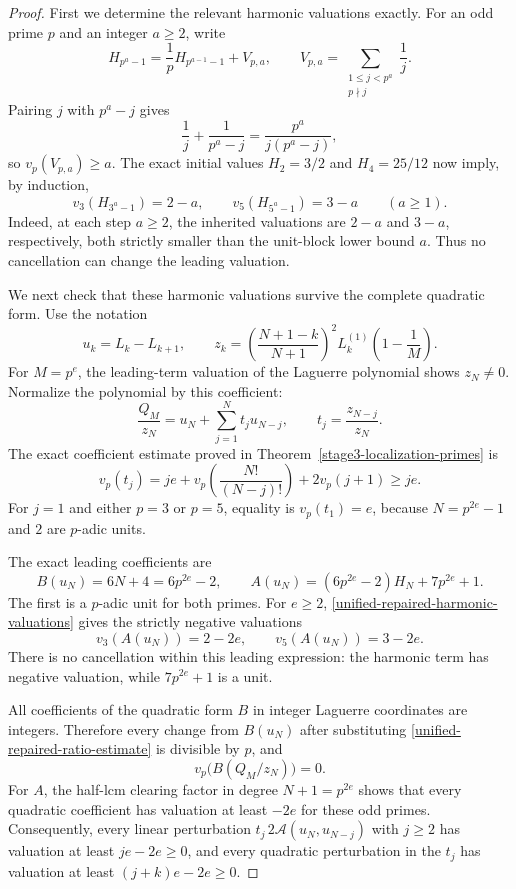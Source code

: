 \documentclass[11pt,a4paper]{article}
\theoremstyle{definition}
\theoremstyle{remark}
\begin{document}
\begin{proof}
First we determine the relevant harmonic valuations exactly.
For an odd prime $p$ and an integer $a\ge2$, write
\[
 H_{p^a-1}=\frac1pH_{p^{a-1}-1}+V_{p,a},
 \qquad
 V_{p,a}=\sum_{\substack{1\le j<p^a\\p\nmid j}}\frac1j.
\]
Pairing $j$ with $p^a-j$ gives
\[
 \frac1j+\frac1{p^a-j}
 =\frac{p^a}{j(p^a-j)},
\]
so $v_p(V_{p,a})\ge a$.  The exact initial values
$H_2=3/2$ and $H_4=25/12$ now imply, by induction,
\begin{equation}\label{unified-repaired-harmonic-valuations}
 v_3(H_{3^a-1})=2-a,
 \qquad
 v_5(H_{5^a-1})=3-a
 \qquad(a\ge1).
\end{equation}
Indeed, at each step $a\ge2$, the inherited valuations are
$2-a$ and $3-a$, respectively, both strictly smaller than the
unit-block lower bound $a$.  Thus no cancellation can change
the leading valuation.

We next check that these harmonic valuations survive the complete
quadratic form.  Use the notation
\[
 u_k=L_k-L_{k+1},\qquad
 z_k=\left(\frac{N+1-k}{N+1}\right)^2
             L_k^{(1)}\!\left(1-\frac1M\right).
\]
For $M=p^e$, the leading-term valuation of the Laguerre polynomial
shows $z_N\ne0$.  Normalize the polynomial by this coefficient:
\[
 \frac{Q_M}{z_N}=u_N+\sum_{j=1}^N t_j u_{N-j},
 \qquad t_j=\frac{z_{N-j}}{z_N}.
\]
The exact coefficient estimate proved in
Theorem~\ref{stage3-localization-primes} is
\begin{equation}\label{unified-repaired-ratio-estimate}
 v_p(t_j)=je+
  v_p\!\left(\frac{N!}{(N-j)!}\right)+2v_p(j+1)
 \ge je.
\end{equation}
For $j=1$ and either $p=3$ or $p=5$, equality is $v_p(t_1)=e$,
because $N=p^{2e}-1$ and $2$ are $p$-adic units.

The exact leading coefficients are
\[
 B(u_N)=6N+4=6p^{2e}-2,
 \qquad
 A(u_N)=(6p^{2e}-2)H_N+7p^{2e}+1.
\]
The first is a $p$-adic unit for both primes.
For $e\ge2$, \eqref{unified-repaired-harmonic-valuations} gives
the strictly negative valuations
\begin{equation}\label{unified-repaired-top-valuations}
 v_3(A(u_N))=2-2e,
 \qquad
 v_5(A(u_N))=3-2e.
\end{equation}
There is no cancellation within this leading expression:
the harmonic term has negative valuation, while
$7p^{2e}+1$ is a unit.

All coefficients of the quadratic form $B$ in integer Laguerre
coordinates are integers.  Therefore every change from $B(u_N)$
after substituting \eqref{unified-repaired-ratio-estimate} is
divisible by $p$, and
\[
 v_p\bigl(B(Q_M/z_N)\bigr)=0.
\]
For $A$, the half-lcm clearing factor in degree $N+1=p^{2e}$
shows that every quadratic coefficient has valuation at least
$-2e$ for these odd primes.  Consequently, every linear
perturbation $t_j\,2\mathcal A(u_N,u_{N-j})$ with $j\ge2$
has valuation at least $je-2e\ge0$, and every quadratic
perturbation in the $t_j$ has valuation at least
$(j+k)e-2e\ge0$.


\end{proof}
\end{document}
